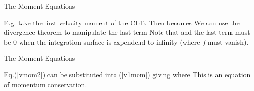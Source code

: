 \documentclass[letterpaper,landscape]{slides}
\begin{document}
\begin{slide}
\begin{center}
{\large \color{red} 
                    The Moment Equations     }
\end{center}

E.g. take the first velocity moment of the CBE. Then
becomes
We can use the divergence theorem to manipulate the last term
Note that 
and the last term must be 0 when the integration surface is expendend to 
infinity (where $f$ must vanish).
\vfill
\end{slide}

\begin{slide}
\begin{center}
{\large \color{red} 
                    The Moment Equations     }
\end{center}
Eq.(\ref{vmom2}) can be substituted into (\ref{v1mom}) giving
where
This is an equation of momentum conservation. 


\vfill
\end{slide}
\end{document}
